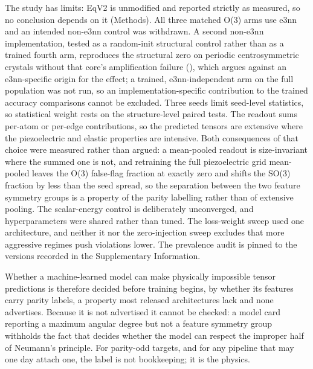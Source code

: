 The study has limits: EqV2 is unmodified and reported strictly as measured, so no conclusion depends on it (Methods). All three matched O(3) arms use e3nn~\cite{geiger2022e3nn} and an intended non-e3nn control was withdrawn. A second non-e3nn implementation, tested as a random-init structural control rather than as a trained fourth arm, reproduces the structural zero on periodic centrosymmetric crystals without that core's amplification failure (), which argues against an e3nn-specific origin for the effect; a trained, e3nn-independent arm on the full population was not run, so an implementation-specific contribution to the trained accuracy comparisons cannot be excluded. Three seeds limit seed-level statistics, so statistical weight rests on the structure-level paired tests. The readout sums per-atom or per-edge contributions, so the predicted tensors are extensive where the piezoelectric and elastic properties are intensive. Both consequences of that choice were measured rather than argued: a mean-pooled readout is size-invariant where the summed one is not, and retraining the full piezoelectric grid mean-pooled leaves the O(3) false-flag fraction at exactly zero and shifts the SO(3) fraction by less than the seed spread, so the separation between the two feature symmetry groups is a property of the parity labelling rather than of extensive pooling. The scalar-energy control is deliberately unconverged, and hyperparameters were shared rather than tuned. The loss-weight sweep used one architecture, and neither it nor the zero-injection sweep excludes that more aggressive regimes push violations lower. The prevalence audit is pinned to the versions recorded in the Supplementary Information.

Whether a machine-learned model can make physically impossible tensor predictions is therefore decided before training begins, by whether its features carry parity labels, a property most released architectures lack and none advertises. Because it is not advertised it cannot be checked: a model card reporting a maximum angular degree but not a feature symmetry group withholds the fact that decides whether the model can respect the improper half of Neumann's principle. For parity-odd targets, and for any pipeline that may one day attach one, the label is not bookkeeping; it is the physics.
